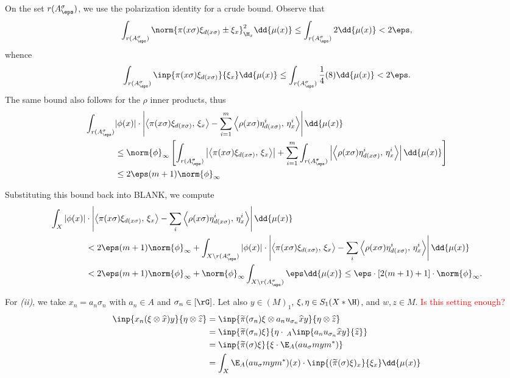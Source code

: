 \documentclass[../main.tex]{subfiles}
\begin{document}
On the set $ r(A^{\sigma}_{\eps}) $, we use the polarization identity for a crude bound. Observe that
\[
    \int_{r(A_{\eps}^{\sigma})} \norm{\pi (x \sigma) \xi_{d(x \sigma)}\pm \xi_{x}}^{2}_{\H_{x}} \dd{\mu(x)} \leq \int_{r(A_{\eps}^{\sigma})} 2 \dd{\mu(x)} < 2 \eps,
\]
whence
\[
    \int_{r(A_{\eps}^{\sigma})} \inp{\pi (x \sigma) \xi_{d(x \sigma)}}{\xi_{x}} \dd{\mu(x)} \leq \int_{r(A_{\eps}^{\sigma})} \frac{1}{4}(8) \dd{\mu(x)} < 2 \eps.
\]
The same bound also follows for the $ \rho $ inner products, thus 
\begin{align*}
    \int_{r(A^{\sigma}_{\eps})}&| \phi(x)| \cdot\left| \left\langle\pi(x \sigma) \xi_{d(x \sigma)},\,\xi_{x}\right\rangle - \sum_{i=1}^{m}  \left\langle\rho(x \sigma) \eta^{i}_{d(x \sigma)},\,\eta^{i}_{x}\right\rangle\right|\dd{\mu(x)} \\
    &\leq  \norm{\phi}_{\infty} \left[\int_{r(A^{\sigma}_{\eps})}\left| \left\langle\pi(x \sigma) \xi_{d(x \sigma)},\,\xi_{x}\right\rangle\right| + \sum_{i=1}^{m}\int_{r(A_{\eps}^{\sigma})}  \left|\left\langle\rho(x \sigma) \eta^{i}_{d(x \sigma)},\,\eta^{i}_{x}\right\rangle\right|\dd{\mu(x)}\right] \\
    &\leq  2\eps(m+1)\norm{\phi}_{\infty} 
\end{align*}


Substituting this bound back into BLANK, we compute
\begin{align*}
    \int_{X}| \phi(x)|& \cdot\left| \left\langle\pi(x \sigma) \xi_{d(x \sigma)},\,\xi_{x}\right\rangle - \sum_{i}  \left\langle\rho(x \sigma) \eta^{i}_{d(x \sigma)},\,\eta^{i}_{x}\right\rangle\right|\dd{\mu(x)} \\
    &< 2 \eps(m+1) \norm{\phi}_{\infty} + \int_{X\setminus r(A_{\eps}^{\sigma})}| \phi(x)| \cdot\left| \left\langle\pi(x \sigma) \xi_{d(x \sigma)},\,\xi_{x}\right\rangle - \sum_{i}  \left\langle\rho(x \sigma) \eta^{i}_{d(x \sigma)},\,\eta^{i}_{x}\right\rangle\right|\dd{\mu(x)} \\
    &< 2 \eps(m+1) \norm{\phi}_{\infty} + \norm{\phi}_{\infty} \int_{X\setminus r(A_{\eps}^{\sigma})} \eps\dd{\mu(x)}  \leq \eps\cdot\left[2(m+1)+1\right]\cdot \norm{\phi}_{\infty}.
\end{align*}

For \emph{(ii)}, we take $x_n=a_n\sigma_n$ with $a_n\in A $ and $ \sigma_n\in [\rG] $. Let also $ y\in (M)_{1} $, $ \xi,\eta\in S_{1}(X\ast \H) $, and $ w,z\in M $. \textcolor{red}{Is this setting enough?}
\begin{align*}
    \inp{x_n ( \xi \otimes \widehat{x})  y}{ \eta \otimes  \widehat{z}} &= \inp{\widetilde{\pi}(\sigma_n) \xi \otimes  a_n u_{\sigma_n} \widehat{x} y}{ \eta \otimes \widehat{z}}\\
    &= \inp{\widetilde{\pi}(\sigma_n) \xi}{ \eta \cdot\, _A \inp{a_n u_{\sigma_n} \widehat{x} y}{\widehat{z}}}\\
    &= \inp{\widetilde{\pi}(\sigma) \xi}{ \xi \cdot \E_{A}(au_{\sigma} mym^{*})}\\
    &= \int_{X}\E_{A}(au_{\sigma} mym^{*})(x) \cdot \inp{(\widetilde{\pi}(\sigma) \xi)_{x}}{\xi_{x}}\dd{\mu(x)}
\end{align*}
\end{document}
